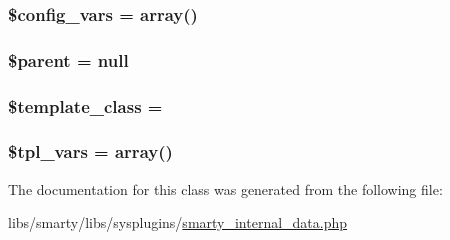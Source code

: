 \subsubsection[{\$config\+\_\+vars}]{\setlength{\rightskip}{0pt plus 5cm}\$config\+\_\+vars = array()}\label{class_smarty___internal___data_a28741040561c71d560ac683f85470955}
\hypertarget{class_smarty___internal___data_a4e2313a4b35b72a06ac45fd38960f677}{}
\subsubsection[{\$parent}]{\setlength{\rightskip}{0pt plus 5cm}\$parent = null}\label{class_smarty___internal___data_a4e2313a4b35b72a06ac45fd38960f677}
\hypertarget{class_smarty___internal___data_aec71b73a60b0ab0f1b53d064254ea02e}{}
\subsubsection[{\$template\+\_\+class}]{\setlength{\rightskip}{0pt plus 5cm}\$template\+\_\+class = \textquotesingle{}}\label{class_smarty___internal___data_aec71b73a60b0ab0f1b53d064254ea02e}
\hypertarget{class_smarty___internal___data_a7a4121f92586859cff6c2da9e3af7ade}{}
\subsubsection[{\$tpl\+\_\+vars}]{\setlength{\rightskip}{0pt plus 5cm}\$tpl\+\_\+vars = array()}\label{class_smarty___internal___data_a7a4121f92586859cff6c2da9e3af7ade}


The documentation for this class was generated from the following file\+:\begin{DoxyCompactItemize}
\item 
libs/smarty/libs/sysplugins/\hyperlink{smarty__internal__data_8php}{smarty\+\_\+internal\+\_\+data.\+php}\end{DoxyCompactItemize}
